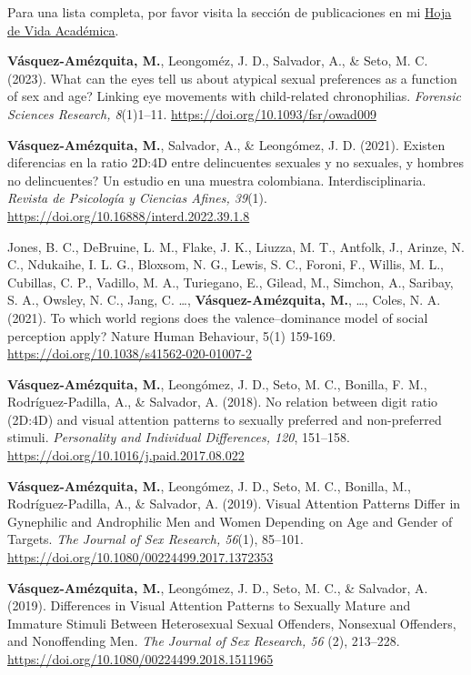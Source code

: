 \documentclass[11pt,a4paper,]{awesome-cv}
\begin{document}
Para una lista completa, por favor visita la sección de publicaciones en
mi \href{https://jdleongomez.info/es/files/MVA_CV_es.pdf}{Hoja de Vida
Académica}.

\begingroup
\setlength{\parindent}{-0.5in}
\setlength{\leftskip}{0.5in}

\textbf{Vásquez-Amézquita, M.}, Leongoméz, J. D., Salvador, A., \& Seto,
M. C. (2023). What can the eyes tell us about atypical sexual
preferences as a function of sex and age? Linking eye movements with
child-related chronophilias. \emph{Forensic Sciences Research,
8}(1)1--11. \url{https://doi.org/10.1093/fsr/owad009}

\textbf{Vásquez-Amézquita, M.}, Salvador, A., \& Leongómez, J. D.
(2021). Existen diferencias en la ratio 2D:4D entre delincuentes
sexuales y no sexuales, y hombres no delincuentes? Un estudio en una
muestra colombiana. Interdisciplinaria. \emph{Revista de Psicología y
Ciencias Afines, 39}(1).
\url{https://doi.org/10.16888/interd.2022.39.1.8}

Jones, B. C., DeBruine, L. M., Flake, J. K., Liuzza, M. T., Antfolk, J.,
Arinze, N. C., Ndukaihe, I. L. G., Bloxsom, N. G., Lewis, S. C., Foroni,
F., Willis, M. L., Cubillas, C. P., Vadillo, M. A., Turiegano, E.,
Gilead, M., Simchon, A., Saribay, S. A., Owsley, N. C., Jang, C. \ldots,
\textbf{Vásquez-Amézquita, M.}, \ldots, Coles, N. A. (2021). To which
world regions does the valence--dominance model of social perception
apply? Nature Human Behaviour, 5(1) 159-169.
\url{https://doi.org/10.1038/s41562-020-01007-2}

\textbf{Vásquez-Amézquita, M.}, Leongómez, J. D., Seto, M. C., Bonilla,
F. M., Rodríguez-Padilla, A., \& Salvador, A. (2018). No relation
between digit ratio (2D:4D) and visual attention patterns to sexually
preferred and non-preferred stimuli. \emph{Personality and Individual
Differences, 120}, 151--158.
\url{https://doi.org/10.1016/j.paid.2017.08.022}

\textbf{Vásquez-Amézquita, M.}, Leongómez, J. D., Seto, M. C., Bonilla,
M., Rodríguez-Padilla, A., \& Salvador, A. (2019). Visual Attention
Patterns Differ in Gynephilic and Androphilic Men and Women Depending on
Age and Gender of Targets. \emph{The Journal of Sex Research, 56}(1),
85--101. \url{https://doi.org/10.1080/00224499.2017.1372353}

\textbf{Vásquez-Amézquita, M.}, Leongómez, J. D., Seto, M. C., \&
Salvador, A. (2019). Differences in Visual Attention Patterns to
Sexually Mature and Immature Stimuli Between Heterosexual Sexual
Offenders, Nonsexual Offenders, and Nonoffending Men. \emph{The Journal
of Sex Research, 56} (2), 213--228.
\url{https://doi.org/10.1080/00224499.2018.1511965}
\end{document}
